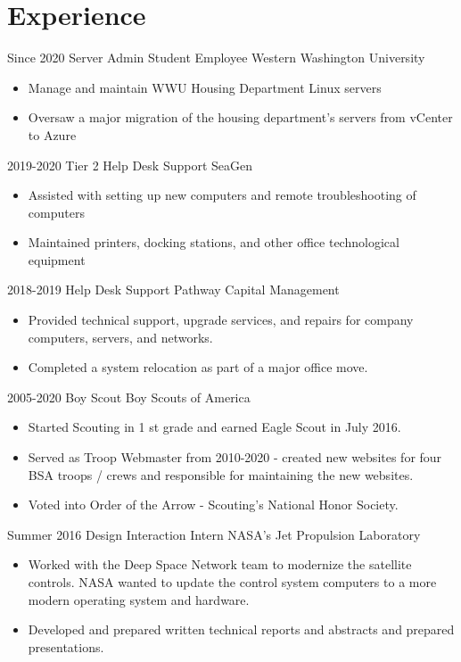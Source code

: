 \documentclass[letterpaper]{twentysecondcv} %
\begin{document}

\section{Experience}

\begin{twenty} %
	\twentyitem
		{Since 2020}
		{Server Admin Student Employee}
		{Western Washington University}
		{\begin{itemize}
			\item Manage and maintain WWU Housing Department Linux servers
			\item Oversaw a major migration of the housing department's servers from vCenter to Azure
		\end{itemize}}
	\twentyitem
		{2019-2020}
		{Tier 2 Help Desk Support}
		{SeaGen}
		{\begin{itemize}
			\item Assisted with setting up new computers and remote troubleshooting of computers
			\item Maintained printers, docking stations, and other office technological equipment
		\end{itemize}}
	\twentyitem
		{2018-2019}
		{Help Desk Support}
		{Pathway Capital Management}
		{\begin{itemize}
			\item Provided technical support, upgrade services, and repairs for company computers, servers, and
			networks.
			\item Completed a system relocation as part of a major office move.
		\end{itemize}}
	\twentyitem
		{2005-2020}
		{Boy Scout}
		{Boy Scouts of America}
		{\begin{itemize}
			\item Started Scouting in 1 st grade and earned Eagle Scout in July 2016.
			\item Served as Troop Webmaster from 2010-2020 - created new websites for four BSA troops / crews and
			responsible for maintaining the new websites.
			\item Voted into Order of the Arrow - Scouting's National Honor Society.
		\end{itemize}}
	\twentyitem
		{Summer 2016}
		{Design Interaction Intern}
		{NASA's Jet Propulsion Laboratory}
		{\begin{itemize}
			\item Worked with the Deep Space Network team to modernize the satellite controls.  NASA wanted to update the control system computers to a more modern operating system and hardware.  
			\item Developed and prepared written technical reports and abstracts and prepared presentations.
		\end{itemize}}
\end{twenty}
\end{document}

